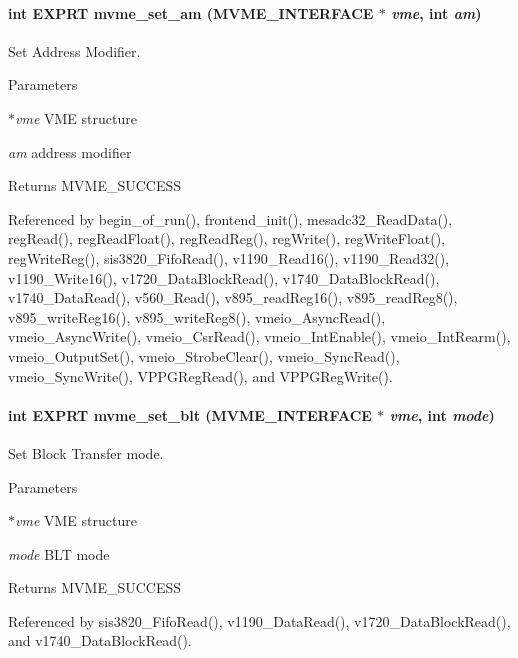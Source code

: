 \paragraph[{mvme\_\-set\_\-am}]{\setlength{\rightskip}{0pt plus 5cm}int EXPRT mvme\_\-set\_\-am ({\bf MVME\_\-INTERFACE} $\ast$ {\em vme}, \/  int {\em am})}\hfill\label{group__mvmestdfunctionh_gaf1529ef7e75316beebc1672840217bd0}
Set Address Modifier. 
\begin{DoxyParams}{Parameters}
\item[{\em $\ast$vme}]VME structure \item[{\em am}]address modifier \end{DoxyParams}
\begin{DoxyReturn}{Returns}
MVME\_\-SUCCESS 
\end{DoxyReturn}


Referenced by begin\_\-of\_\-run(), frontend\_\-init(), mesadc32\_\-ReadData(), regRead(), regReadFloat(), regReadReg(), regWrite(), regWriteFloat(), regWriteReg(), sis3820\_\-FifoRead(), v1190\_\-Read16(), v1190\_\-Read32(), v1190\_\-Write16(), v1720\_\-DataBlockRead(), v1740\_\-DataBlockRead(), v1740\_\-DataRead(), v560\_\-Read(), v895\_\-readReg16(), v895\_\-readReg8(), v895\_\-writeReg16(), v895\_\-writeReg8(), vmeio\_\-AsyncRead(), vmeio\_\-AsyncWrite(), vmeio\_\-CsrRead(), vmeio\_\-IntEnable(), vmeio\_\-IntRearm(), vmeio\_\-OutputSet(), vmeio\_\-StrobeClear(), vmeio\_\-SyncRead(), vmeio\_\-SyncWrite(), VPPGRegRead(), and VPPGRegWrite().
\paragraph[{mvme\_\-set\_\-blt}]{\setlength{\rightskip}{0pt plus 5cm}int EXPRT mvme\_\-set\_\-blt ({\bf MVME\_\-INTERFACE} $\ast$ {\em vme}, \/  int {\em mode})}\hfill\label{group__mvmestdfunctionh_ga21ab5a5c29da5830bf264d8fd5753a52}
Set Block Transfer mode. 
\begin{DoxyParams}{Parameters}
\item[{\em $\ast$vme}]VME structure \item[{\em mode}]BLT mode \end{DoxyParams}
\begin{DoxyReturn}{Returns}
MVME\_\-SUCCESS 
\end{DoxyReturn}


Referenced by sis3820\_\-FifoRead(), v1190\_\-DataRead(), v1720\_\-DataBlockRead(), and v1740\_\-DataBlockRead().
